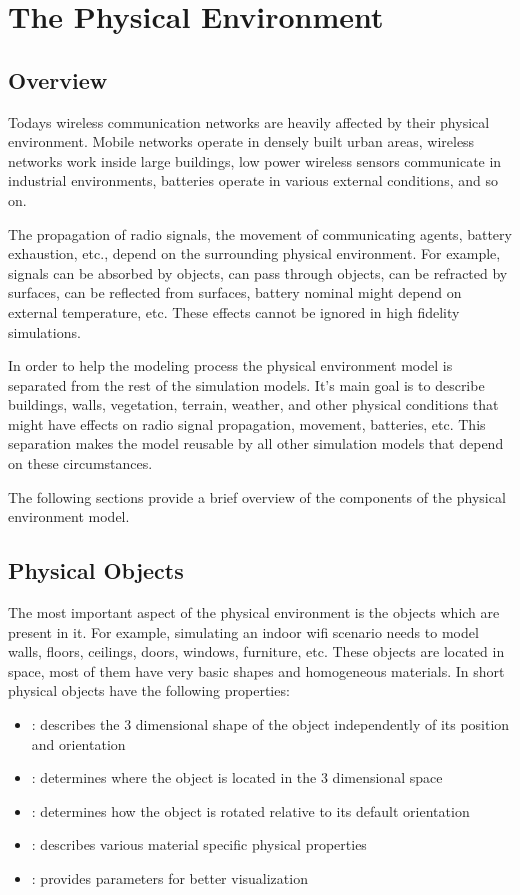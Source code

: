 \chapter{The Physical Environment}
\label{cha:environment}

\section{Overview}

Todays wireless communication networks are heavily affected by their physical
environment. Mobile networks operate in densely built urban areas, wireless
networks work inside large buildings, low power wireless sensors communicate
in industrial environments, batteries operate in various external conditions,
and so on.

The propagation of radio signals, the movement of communicating agents, battery
exhaustion, etc., depend on the surrounding physical environment. For example,
signals can be absorbed by objects, can pass through objects, can be refracted
by surfaces, can be reflected from surfaces, battery nominal might depend on
external temperature, etc. These effects cannot be ignored in high fidelity
simulations.

In order to help the modeling process the physical environment model is
separated from the rest of the simulation models. It's main goal is to describe
buildings, walls, vegetation, terrain, weather, and other physical conditions
that might have effects on radio signal propagation, movement, batteries, etc.
This separation makes the model reusable by all other simulation models that
depend on these circumstances.

The following sections provide a brief overview of the components of the
physical environment model. 

\section{Physical Objects}

The most important aspect of the physical environment is the objects which are
present in it. For example, simulating an indoor wifi scenario needs to model
walls, floors, ceilings, doors, windows, furniture, etc. These objects are
located in space, most of them have very basic shapes and homogeneous materials.
In short physical objects have the following properties:

\begin{itemize}
  \item {}: describes the 3 dimensional shape of the object
independently of its position and orientation
  \item {}: determines where the object is located in the 3
dimensional space
  \item {}: determines how the object is rotated relative to its
default orientation
  \item {}: describes various material specific physical properties  
  \item {}: provides parameters for better visualization
\end{itemize}

